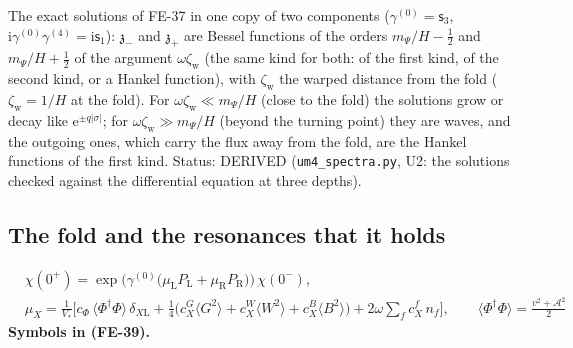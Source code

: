 \documentclass[
  10pt,
]{article}
\begin{document}
The exact solutions of FE-37 in one copy of two components
(\(\gamma^{(0)} = \mathsf{s}_3\),
\(\mathrm{i}\gamma^{(0)}\gamma^{(4)} = \mathrm{i}\mathsf{s}_1\)):
\(\mathfrak{z}_-\) and \(\mathfrak{z}_+\) are Bessel functions of the
orders \(m_\Psi/H - \frac12\) and \(m_\Psi/H + \frac12\) of the argument
\(\omega\zeta_{\mathrm{w}}\) (the same kind for both: of the first kind,
of the second kind, or a Hankel function), with \(\zeta_{\mathrm{w}}\)
the warped distance from the fold (\(\zeta_{\mathrm{w}} = 1/H\) at the
fold). For \(\omega\zeta_{\mathrm{w}} \ll m_\Psi/H\) (close to the fold)
the solutions grow or decay like
\(\mathrm{e}^{\pm q\lvert\sigma\rvert}\); for
\(\omega\zeta_{\mathrm{w}} \gg m_\Psi/H\) (beyond the turning point)
they are waves, and the outgoing ones, which carry the flux away from
the fold, are the Hankel functions of the first kind. Status: DERIVED
(\texttt{um4\_spectra.py}, U2: the solutions checked against the
differential equation at three depths).

\hypertarget{the-fold-and-the-resonances-that-it-holds}{%
\subsection{The fold and the resonances that it
holds}\label{the-fold-and-the-resonances-that-it-holds}}

\[
\begin{aligned}
&\chi(0^+) = \exp\Big(\gamma^{(0)}\big(\mu_{\mathrm{L}}P_{\mathrm{L}} + \mu_{\mathrm{R}}P_{\mathrm{R}}\big)\Big)\,\chi(0^-),\\
&\mu_X = \frac{1}{V_*}\Big[c_\Phi\,\langle\Phi^\dagger\Phi\rangle\,\delta_{X\mathrm{L}} + \frac14\big(c^{G}_X\langle G^2\rangle
 + c^{W}_X\langle W^2\rangle + c^{B}_X\langle B^2\rangle\big) + 2\omega\sum_f c^{f}_X\,n_f\Big],\qquad
 \langle\Phi^\dagger\Phi\rangle = \frac{v^2 + \mathcal{A}^2}{2}
\end{aligned} \tag{FE-39}
\] \textbf{Symbols in (FE-39).}
\end{document}
